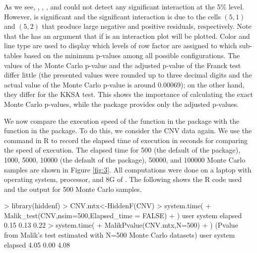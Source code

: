 As we see, , , , and  could not detect any significant interaction at the 5\% level. However,  is significant and the significant interaction is due to the cells $\left(5,1\right)$ and $\left(5,2\right)$ that produce large negative and positive residuals, respectively. Note that the  has an argument  that if  is  an interaction plot will be plotted. Color and line type are used to display which levels of row factor are assigned to which sub-tables based on the minimum p-values among all possible configurations. The values of the Monte Carlo p-value and the adjusted p-value of the Franck test {differ little} (the presented values were rounded up to three decimal digits and the actual value of the Monte Carlo p-value is around 0.00069){; on the other hand,} they differ for the KKSA test. This shows the importance of calculating the exact Monte Carlo p-values, while the package  provides only the adjusted p-values.

We now compare the {execution speed} of the  function in the   package with the  function in the  package. To do this, we consider the CNV data again. We use the command  in R to record the elapsed time of execution in seconds for comparing the speed of execution. The elapsed time for 500 (the default of the  package), 1000, 5000, 10000 (the default of the  package), 50000, and 100000 Monte Carlo samples are shown in Figure \ref{fig:3}. All computations were done on a laptop with  operating system,  processor, and 8G of . The following shows {the R code used} and the output for 500 Monte Carlo samples.
\begin{example}
	> library(hiddenf)
	> CNV.mtx<-HiddenF(CNV)
	> system.time(
	+ Malik_test(CNV,nsim=500,Elapsed_time = FALSE)
	+ )
	user  system elapsed 
	0.15    0.13    0.22 
	> system.time(
	+ MalikPvalue(CNV.mtx,N=500)
	+ )
	(Pvalue from Malik's test estimated with N=500 Monte Carlo datasets) 
	user  system elapsed 
	4.05    0.00    4.08 
\end{example}

